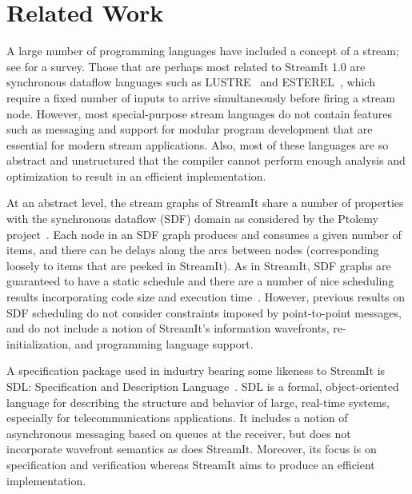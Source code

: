 \section{Related Work}
\label{sec:related}
A large number of programming languages have included a concept of a
stream; see \cite{survey97} for a survey.  Those that are perhaps most
related to StreamIt 1.0 are synchronous dataflow languages such as
LUSTRE~\cite{lustre} and ESTEREL~\cite{esterel92}, which require a fixed
number of inputs to arrive simultaneously before firing a stream node.
However, most special-purpose stream languages do not contain features
such as messaging and support for modular program development that are
essential for modern stream applications.  Also, most of these languages
are so abstract and unstructured that the compiler cannot perform enough
analysis and optimization to result in an efficient implementation.

At an abstract level, the stream graphs of StreamIt share a number of
properties with the synchronous dataflow (SDF) domain as considered by
the Ptolemy project~\cite{ptolemyoverview}.  Each node in an SDF graph
produces and consumes a given number of items, and there can be delays
along the arcs between nodes (corresponding loosely to items that are
peeked in StreamIt).  As in StreamIt, SDF graphs are guaranteed to
have a static schedule and there are a number of nice scheduling
results incorporating code size and execution time~\cite{leesdf}.
However, previous results on SDF scheduling do not consider
constraints imposed by point-to-point messages, and do not include a
notion of StreamIt's information wavefronts, re-initialization, and
programming language support.

A specification package used in industry bearing some likeness to
StreamIt is SDL: Specification and Description Language~\cite{sdlrec}.
SDL is a formal, object-oriented language for describing the structure
and behavior of large, real-time systems, especially for
telecommunications applications.  It includes a notion of asynchronous
messaging based on queues at the receiver, but does not incorporate
wavefront semantics as does StreamIt.  Moreover, its focus is on
specification and verification whereas StreamIt aims to produce an
efficient implementation.

